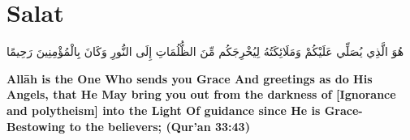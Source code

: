 \chapter{Salat}
\begin{center}
    {\Huge    
        \begin{Arabic}
            هُوَ الَّذِي يُصَلِّي عَلَيْكُمْ وَمَلَائِكَتُهُ لِيُخْرِجَكُم مِّنَ الظُّلُمَاتِ إِلَى النُّورِ وَكَانَ بِالْمُؤْمِنِينَ رَحِيمًا
        \end{Arabic}
    }    
\end{center}
\vspace*{\fill}
\vspace{3cm}
\begin{center}
    \large \textbf{Allāh is the One Who sends you Grace And greetings as do His Angels, that He May bring you out from the darkness of [Ignorance and polytheism] into the Light Of guidance since He is Grace-Bestowing to the believers; (Qur'an 33:43)}
\end{center}
